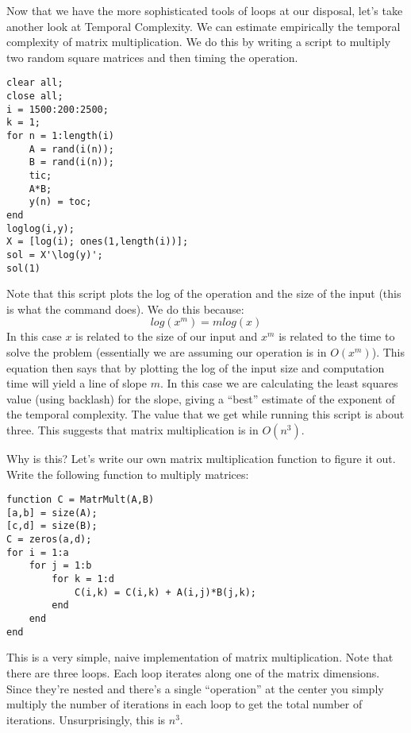 

Now that we have the more sophisticated tools of loops at our disposal, let's take another look at Temporal Complexity. We can estimate empirically the temporal complexity of matrix multiplication. We do this by writing a script to multiply two random square matrices and then timing the operation.

\begin{lstlisting}[style=matlab]
clear all;
close all;
i = 1500:200:2500;
k = 1;
for n = 1:length(i)
    A = rand(i(n));
    B = rand(i(n));
    tic;
    A*B;
    y(n) = toc;
end
loglog(i,y);
X = [log(i); ones(1,length(i))];
sol = X'\log(y)';
sol(1)
\end{lstlisting}

Note that this script plots the log of the operation and the size of the input (this is what the command  does). We do this because:
\[
log(x^m) = m log(x)
\]
In this case $x$ is related to the size of our input and $x^m$ is related to the time to solve the problem (essentially we are assuming our operation is in $O(x^m)$). This equation then says that by plotting the log of the input size and computation time will yield a line of slope $m$.
In this case we are calculating the least squares value (using backlash) for the slope, giving a ``best'' estimate of the exponent of the temporal complexity. The value that we get while running this script is about three. This suggests that matrix multiplication is in $O(n^3)$.

Why is this? Let's write our own matrix multiplication function to figure it out. Write the following function to multiply matrices:

\begin{lstlisting}[style=matlab]
function C = MatrMult(A,B)
[a,b] = size(A);
[c,d] = size(B);
C = zeros(a,d);
for i = 1:a
    for j = 1:b
        for k = 1:d
            C(i,k) = C(i,k) + A(i,j)*B(j,k);
        end
    end
end
\end{lstlisting}

This is a very simple, naive implementation of matrix multiplication. Note that there are three  loops. Each loop iterates along one of the matrix dimensions. Since they're nested and there's a single ``operation'' at the center you simply multiply the number of iterations in each loop to get the total number of iterations. Unsurprisingly, this is $n^3$.

